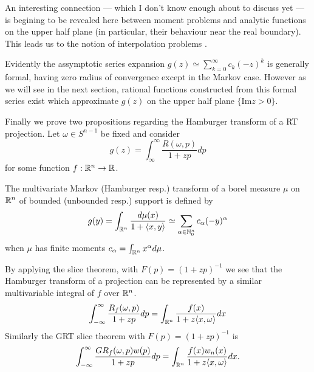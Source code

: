 \begin{remark}
  An interesting connection — which I don't know enough about to discuss yet — is begining to be revealed here between moment problems and analytic functions on the upper half plane (in particular, their behaviour near the real boundary). This leads us to the notion of interpolation problems \cn.
\end{remark}

Evidently the assymptotic series expansion $g(z) \simeq \sum_{k=0}^\infty c_k {(-z)}^k$ is generally formal, having zero radius of convergence except in the Markov case. However as we will see in the next section, rational functions constructed from this formal series exist which approximate $g(z)$ on the upper half plane $\{\text{Im} z > 0\}$.

Finally we prove two propositions regarding the Hamburger transform of a RT projection. Let $\omega \in S^{n-1}$ be fixed and consider
\[
  g(z) = \int_\infty^\infty \frac{R(\omega, p)}{1 + zp} dp
\]
for some function $f: \mathbb{R}^n \to \mathbb{R}$. 
\begin{definition}
  The multivariate Markov (Hamburger resp.) transform of a borel measure $\mu$ on $\mathbb{R}^n$ of bounded (unbounded resp.) support is defined by
  \[
    g(y) = \int_{\mathbb{R}^n} \frac{d\mu(x)}{1 + \langle x, y\rangle} \simeq \sum_{\alpha \in \mathbb{N}_0^n} c_\alpha(-y)^\alpha
  \]
  when $\mu$ has finite moments $c_\alpha = \int_{\mathbb{R}^n} x^\alpha d\mu$.
\end{definition}

  
By applying the slice theorem, with $F(p) = {(1+zp)}^{-1}$ we see that the Hamburger transform of a projection can be represented by a similar multivariable integral of $f$ over $\mathbb{R}^n$.
\[
  \int_{-\infty}^\infty \frac{R_f(\omega, p)}{1 + zp} dp = \int_{\mathbb{R}^n} \frac{f(x)}{1 + z\langle x, \omega \rangle} dx
\]
Similarly the GRT slice theorem with $F(p) = {(1 + zp)}^{-1}$ is
\[
  \int_{-\infty}^\infty \frac{GR_f(\omega, p) w(p)}{1 + zp} dp = \int_{\mathbb{R}^n} \frac{f(x)w_n(x)}{1 + z\langle x, \omega \rangle} dx.
\]


